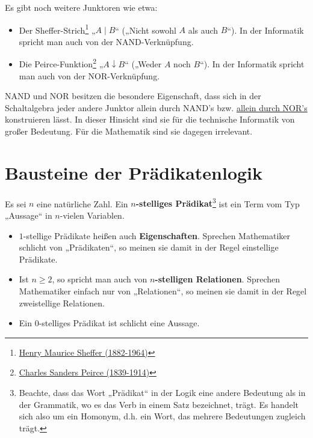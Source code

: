 	
\begin{vorschau}
    Es gibt noch weitere Junktoren wie etwa:
    \begin{itemize}
        \item Der Sheffer-Strich\footnote{\href{https://de.wikipedia.org/wiki/Henry_Maurice_Sheffer}{Henry Maurice Sheffer (1882-1964)}} „$A\mid B$“ („Nicht sowohl $A$ als auch $B$“). In der Informatik spricht man auch von der NAND-Verknüpfung.
        \item Die Peirce-Funktion\footnote{\href{https://de.wikipedia.org/wiki/Charles_Sanders_Peirce}{Charles Sanders Peirce (1839-1914)}} „$A\downarrow B$“ („Weder $A$ noch $B$“). In der Informatik spricht man auch von der NOR-Verknüpfung.
    \end{itemize}
    NAND und NOR besitzen die besondere Eigenschaft, dass sich in der Schaltalgebra jeder andere Junktor allein durch NAND's bzw. \href{https://de.wikipedia.org/wiki/NOR-Gatter#Logiksynthese}{allein durch NOR's} konstruieren lässt. In dieser Hinsicht sind sie für die technische Informatik von großer Bedeutung. Für die Mathematik sind sie dagegen irrelevant.
\end{vorschau}




	
\section{Bausteine der Prädikatenlogik}


\begin{de}[Prädikat] \label{def:praedikat}  
    Es sei $n$ eine natürliche Zahl. Ein \textbf{$n$-stelliges Prädikat}\footnote{Beachte, dass das Wort „Prädikat“ in der Logik eine andere Bedeutung als in der Grammatik, wo es das Verb in einem Satz bezeichnet, trägt. Es handelt sich also um ein Homonym, d.h. ein Wort, das mehrere Bedeutungen zugleich trägt.} ist ein Term vom Typ „Aussage“ in $n$-vielen Variablen.
    \begin{itemize}
        \item $1$-stellige Prädikate heißen auch \textbf{Eigenschaften}. Sprechen Mathematiker schlicht von „Prädikaten“, so meinen sie damit in der Regel einstellige Prädikate.
        \item Ist $n\ge 2$, so spricht man auch von \textbf{$n$-stelligen Relationen}. Sprechen Mathematiker einfach nur von „Relationen“, so meinen sie damit in der Regel zweistellige Relationen.
        \item Ein $0$-stelliges Prädikat ist schlicht eine Aussage.
    \end{itemize}
\end{de}


